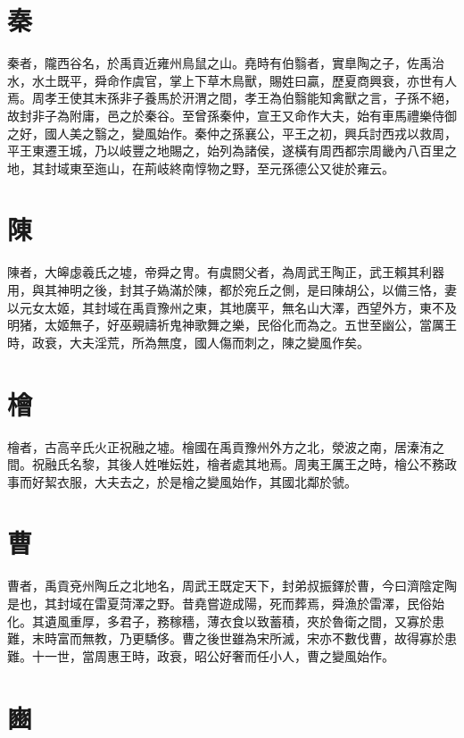 \section*{秦}

秦者，隴西谷名，於禹貢近雍州鳥鼠之山。堯時有伯翳者，實臯陶之子，佐禹治水，水土既平，舜命作虞官，掌上下草木鳥獸，賜姓曰贏，歷夏商興衰，亦世有人焉。周孝王使其末孫非子養馬於汧渭之間，孝王為伯翳能知禽獸之言，子孫不絕，故封非子為附庸，邑之於秦谷。至曾孫秦仲，宣王又命作大夫，始有車馬禮樂侍御之好，國人美之翳之，變風始作。秦仲之孫襄公，平王之初，興兵討西戎以救周，平王東遷王城，乃以岐豐之地賜之，始列為諸侯，遂橫有周西都宗周畿內八百里之地，其封域東至迤山，在荊岐終南惇物之野，至元孫德公又徙於雍云。

\section*{陳}

陳者，大皞虙羲氏之墟，帝舜之冑。有虞閼父者，為周武王陶正，武王賴其利器用，與其神明之後，封其子媯滿於陳，都於宛丘之側，是曰陳胡公，以備三恪，妻以元女太姬，其封域在禹貢豫州之東，其地廣平，無名山大澤，西望外方，東不及明猪，太姬無子，好巫覡禱祈鬼神歌舞之樂，民俗化而為之。五世至幽公，當厲王時，政衰，大夫淫荒，所為無度，國人傷而刺之，陳之變風作矣。

\section*{檜}

檜者，古高辛氏火正祝融之墟。檜國在禹貢豫州外方之北，滎波之南，居溱洧之間。祝融氏名黎，其後人姓唯妘姓，檜者處其地焉。周夷王厲王之時，檜公不務政事而好絜衣服，大夫去之，於是檜之變風始作，其國北鄰於虢。

\section*{曹}

曹者，禹貢兗州陶丘之北地名，周武王既定天下，封弟叔振鐸於曹，今曰濟陰定陶是也，其封域在雷夏菏澤之野。昔堯嘗遊成陽，死而葬焉，舜漁於雷澤，民俗始化。其遺風重厚，多君子，務稼穡，薄衣食以致蓄積，夾於魯衛之間，又寡於患難，末時富而無教，乃更驕侈。曹之後世雖為宋所滅，宋亦不數伐曹，故得寡於患難。十一世，當周惠王時，政衰，昭公好奢而任小人，曹之變風始作。

\section*{豳}

